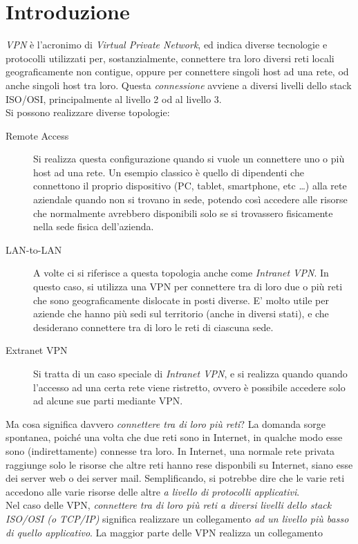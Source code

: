 \section{Introduzione}
\textit{VPN} è l'acronimo di \textit{Virtual Private Network}, ed indica diverse
tecnologie e protocolli utilizzati per, sostanzialmente, connettere tra loro
diversi reti locali geograficamente non contigue, oppure per connettere singoli host
ad una rete,
od anche singoli host tra loro. Questa \textit{connessione} avviene a diversi livelli dello stack
ISO/OSI, principalmente al livello 2 od al livello 3.\\
Si possono realizzare diverse topologie:
\begin{description}
  \item[Remote Access]Si realizza questa configurazione quando si vuole un connettere
  uno o più host ad una rete. Un esempio classico è quello di dipendenti che connettono
  il proprio dispositivo (PC, tablet, smartphone, etc \ldots) alla rete aziendale
  quando non si trovano in sede, potendo così accedere alle risorse che normalmente
  avrebbero disponibili solo se si trovassero fisicamente nella sede fisica dell'azienda.
  \item[LAN-to-LAN]A volte ci si riferisce a questa topologia anche come \textit{Intranet
  VPN}. In questo caso, si utilizza una VPN per connettere tra di loro due o più
  reti che sono geograficamente dislocate in posti diverse. E' molto utile per aziende
  che hanno più sedi sul territorio (anche in diversi stati), e che desiderano connettere
  tra di loro le reti di ciascuna sede.
  \item[Extranet VPN]Si tratta di un caso speciale di \textit{Intranet VPN}, e si realizza
  quando quando l'accesso ad una certa rete viene ristretto, ovvero è possibile accedere
  solo ad alcune sue parti mediante VPN.
\end{description}
Ma cosa significa davvero \textit{connettere tra di loro più reti}? La domanda sorge
spontanea, poiché una volta che due reti sono in Internet, in qualche modo
esse sono (indirettamente) connesse tra loro. In Internet, una normale rete privata
raggiunge solo le risorse che altre reti hanno rese disponbili su Internet,
siano esse dei server web o dei server mail.
Semplificando, si potrebbe dire che le varie reti accedono alle varie risorse delle
altre \textit{a livello di protocolli applicativi}.\\
Nel caso delle VPN, \textit{connettere tra di loro più reti a diversi livelli dello
stack ISO/OSI (o TCP/IP)} significa realizzare un collegamento \textit{ad un livello
più basso di quello applicativo}. La maggior parte delle VPN realizza un collegamento
